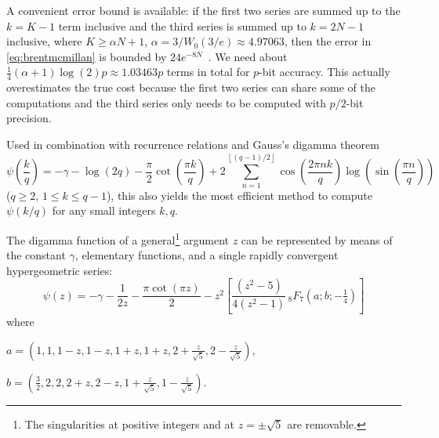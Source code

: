 \documentclass[reqno]{amsart}
\theoremstyle{definition}
\begin{document}
A convenient error bound is available: if the first two series are summed up to the $k = K-1$ term
inclusive and the third series is summed up to $k = 2N-1$ inclusive,
where $K \ge \alpha N + 1$, $\alpha = 3 / W_0(3/e) \approx 4.97063$,
then the error in \eqref{eq:brentmcmillan} is bounded by $24 e^{-8N}$~\cite{BrentJohansson2013bound}.
We need about $\tfrac{1}{4} (\alpha+1) \log(2) p \approx 1.03463 p$ terms in total for $p$-bit accuracy.
This actually overestimates the true cost
because the first two series can share some of the
computations and the third series only needs to be computed with $p/2$-bit precision.



Used in combination with recurrence relations and Gauss's digamma theorem
\begin{equation}
\psi\!\left(\frac{k}{q}\right) = -\gamma - \log\!\left(2 q\right) - \frac{\pi}{2} \cot\!\left(\frac{\pi k}{q}\right) + 2 \sum_{n=1}^{\left\lfloor \left( q - 1 \right) / 2 \right\rfloor} \cos\!\left(\frac{2 \pi n k}{q}\right) \log\!\left(\sin\!\left(\frac{\pi n}{q}\right)\right)
\end{equation}
($q \ge 2$, $1 \le k \le q - 1$),
this also yields the most efficient method to
compute $\psi(k/q)$ for any small integers $k, q$.

The digamma function of a general\footnote{The singularities at positive integers and at $z = \pm \sqrt{5}$ are removable.} argument $z$ can be represented
by means of the constant $\gamma$, elementary functions, and a single rapidly convergent hypergeometric series:
\begin{equation}
\psi(z) = -\gamma - \frac{1}{2z} - \frac{\pi \cot(\pi z)}{2} - z^2 \left[ \frac{(z^2-5)}{4 (z^2-1)} \, {}_8F_7 ( a; b; -\tfrac{1}{4} ) \right]
\label{eq:zetagen1}
\end{equation}
where
\begin{center}
$a = (1, 1, 1-z, 1-z, 1+z, 1+z, 2+\tfrac{z}{\sqrt{5}}, 2-\tfrac{z}{\sqrt{5}})$,

$b = (\tfrac{3}{2}, 2, 2, 2+z, 2-z, 1+\tfrac{z}{\sqrt{5}}, 1-\tfrac{z}{\sqrt{5}})$.
\end{center}
\end{document}
